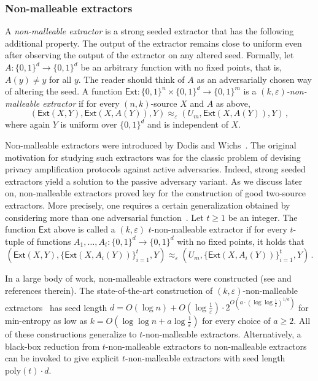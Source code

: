 \documentclass[11pt]{article}
\numberwithin{equation}{section}
\theoremstyle{definition}
\theoremstyle{plain}
\newcommand{\ext}{\mathsf{Ext}}
\newcommand{\adv}{A}
\newcommand{\eps}{\varepsilon}
\def\poly{{\mathrm{poly}}}
\begin{document}
%
%
\subsubsection{Non-malleable extractors}
%
A \emph{non-malleable extractor} is a strong seeded extractor that has the following additional property. The output of the extractor remains close to uniform even after observing the output of the extractor on any altered seed. Formally, let $\adv \colon \{0,1\}^d \to \{0,1\}^d$ be an arbitrary function with no fixed points, that is, $\adv(y) \neq y$ for all $y$. The reader should think of $\adv$ as an adversarially chosen way of altering the seed. A function $\ext \colon \{0,1\}^n \times \{0,1\}^d \to \{0,1\}^m$ is a \emph{$(k,\eps)$-non-malleable extractor} if for every $(n,k)$-source $X$ and $\adv$ as above,
\begin{equation}\label{eq:nmext}
(\ext(X,Y),\ext(X,\adv(Y)),Y) \approx_\eps (U_m, \ext(X,\adv(Y)),Y)\,,
\end{equation}
where again $Y$ is uniform over $\{0,1\}^d$ and is independent of $X$. %



Non-malleable extractors were introduced by Dodis and Wichs~\cite{DW09}. The original motivation for studying such extractors %
was  %
for the classic problem of devising privacy amplification protocols against active adversaries. Indeed, strong seeded extractors yield a solution to the passive adversary variant. As we discuss later on, non-malleable extractors proved key for the construction of good two-source extractors. More precisely, one requires a certain generalization obtained by considering more than one adversarial function~\cite{CRS12}. Let $t \ge 1$ be an integer. The function $\ext$ above is called a $(k,\eps)$ $t$-non-malleable extractor if for every $t$-tuple of functions $\adv_1,\ldots,\adv_t \colon \{0,1\}^d \to \{0,1\}^d$ with no fixed points, it holds that
\[
(\ext(X,Y),\{\ext(X,\adv_i(Y))\}_{i=1}^{t},Y) \approx_\eps (U_m, \{\ext(X,\adv_i(Y))\}_{i=1}^{t},Y)\,.
\]

In a %
large body of work,
non-malleable extractors were constructed (see \cite{DLWTZ11,CRS12,Li15,Cohen16b,CGL16,Cohen16d,CS16,CL16,Cohen16c,Li17} and references therein). The state-of-the-art construction of $(k,\eps)$-non-malleable extractors~\cite{Li19} has seed length $d = O(\log{n})+ O(\log\frac1{\eps}) \cdot 2^{O(a \cdot (\log\log\frac1{\eps})^{1/a})}$ for min-entropy as low as $k = O(\log\log{n} + a \log\frac1{\eps})$ for every choice of $a \ge 2$. All of these constructions generalize to $t$-non-malleable extractors. Alternatively, a black-box reduction from $t$-non-malleable extractors to non-malleable extractors~\cite{Cohen16d} can be invoked to give explicit $t$-non-malleable extractors with seed length $\poly(t) \cdot d$.
\end{document}
